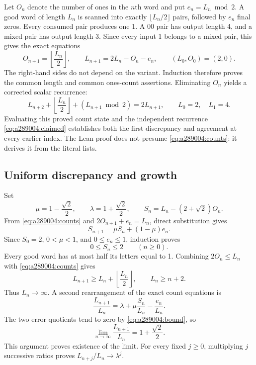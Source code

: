 Let $O_n$ denote the number of ones in the $n$th word and put
$e_n=L_n\bmod2$. A good word of length $L_n$ is scanned into exactly
$\lfloor L_n/2\rfloor$ pairs, followed by $e_n$ final zeros.
Every consumed pair produces one 1. A $00$ pair has output length 4,
and a mixed pair has output length 3. Since every input 1 belongs to
a mixed pair, this gives the exact equations
\begin{equation}
 O_{n+1}=\left\lfloor\frac{L_n}{2}\right\rfloor,
 \qquad
 L_{n+1}=2L_n-O_n-e_n,
 \qquad (L_0,O_0)=(2,0).
 \label{eq:a289004:counts}
\end{equation}
The right-hand sides do not depend on the variant. Induction therefore
proves the common length and common ones-count assertions. Eliminating
$O_n$ yields a corrected scalar recurrence:
\begin{equation}
 L_{n+2}+\left\lfloor\frac{L_n}{2}\right\rfloor
       +(L_{n+1}\bmod2)=2L_{n+1},
 \qquad L_0=2,\quad L_1=4.
 \label{eq:a289004:corrected}
\end{equation}
Evaluating this proved count state and the independent recurrence
\eqref{eq:a289004:claimed} establishes both the first discrepancy and
agreement at every earlier index. The Lean proof does not presume
\eqref{eq:a289004:counts}: it derives it from the literal lists.

\subsection{Uniform discrepancy and growth}

Set
\[
 \mu=1-\frac{\sqrt2}{2},\qquad
 \lambda=1+\frac{\sqrt2}{2},\qquad
 S_n=L_n-(2+\sqrt2)O_n.
\]
From \eqref{eq:a289004:counts} and
$2O_{n+1}+e_n=L_n$, direct substitution gives
\begin{equation}
 S_{n+1}=\mu S_n+(1-\mu)e_n.
 \label{eq:a289004:error}
\end{equation}
Since $S_0=2$, $0<\mu<1$, and $0\le e_n\le1$, induction proves
\begin{equation}
 0\le S_n\le2\qquad(n\ge0).
 \label{eq:a289004:bound}
\end{equation}
Every good word has at most half its letters equal to 1. Combining
$2O_n\le L_n$ with \eqref{eq:a289004:counts} gives
\[
 L_{n+1}\ge L_n+\left\lfloor\frac{L_n}{2}\right\rfloor,
 \qquad L_n\ge n+2.
\]
Thus $L_n\to\infty$. A second rearrangement of the exact count equations is
\begin{equation}
 \frac{L_{n+1}}{L_n}
 =\lambda+\mu\frac{S_n}{L_n}-\frac{e_n}{L_n}.
 \label{eq:a289004:ratio}
\end{equation}
The two error quotients tend to zero by \eqref{eq:a289004:bound}, so
\begin{equation}
 \lim_{n\to\infty}\frac{L_{n+1}}{L_n}
 =1+\frac{\sqrt2}{2}.
 \label{eq:a289004:limit}
\end{equation}
This argument proves existence of the limit. For every fixed
$j\ge0$, multiplying $j$ successive ratios proves
$L_{n+j}/L_n\to\lambda^j$.

